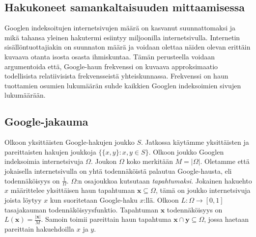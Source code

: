 \documentclass[12pt,finnish]{tktltiki2}
\theoremstyle{definition}
\theoremstyle{remark}
\begin{document}

    \subsection{Hakukoneet samankaltaisuuden mittaamisessa} %
    \label{sub:hakukoneet_samankaltaisuuden_mittaamisessa}

    Googlen indeksoitujen internetsivujen määrä on kasvanut suunnattomaksi ja mikä tahansa yleinen hakutermi esiintyy miljoonilla internetsivulla. Internetin sisällöntuottajiakin on suunnaton määrä ja voidaan olettaa näiden olevan erittäin kuvaava otanta isosta osasta ihmiskuntaa.
    Tämän perusteella voidaan argumentoida että, Google-haun frekvenssi on kuvaava approksimaatio todellisista relatiivisista frekvensseistä yhteiskunnassa.
    Frekvenssi on haun tuottamien osumien lukumäärän suhde kaikkien Googlen indeksoimien sivujen lukumäärään. \cite{cilibrasi2007google}

    \subsection{Google-jakauma} %
    \label{sub:google_jakauma}
      Olkoon yksittäisten Google-hakujen joukko $S$.
      Jatkossa käytämme yksittäisten ja pareittaisten hakujen joukkoja $\{\{x,y\}:x,y \in S\}$.
      Olkoon joukko Googlen indeksoimia internetsivuja $\Omega$.
      Joukon $\Omega$ koko merkitään $M = |\Omega|$.
      Oletamme että jokaisella internetsivulla on yhtä todennäköistä palautua Google-hausta, eli todennäköisyys on $\frac{1}{\Omega}$.
      $\Omega$:n osajoukkoa kutsutaan \emph{tapahtumaksi}.
      Jokainen hakuehto $x$ määrittelee yksittäisen haun tapahtuman $\mathbf{x}\subseteq \Omega$, tämä on joukko internetsivuja joista löytyy $x$ kun suoritetaan Google-haku $x$:llä.
      Olkoon $L: \Omega \rightarrow [0,1]$ tasajakauman todennäköisyysfunktio.
      Tapahtuman $\mathbf{x}$ todennäköisyys on $L(\mathbf{x}) = \frac{|\mathbf{x}|}{M}$.
      Samoin toimii pareittain haun tapahtuma $\mathbf{x}\cap\mathbf{y}\subseteq\Omega$, jossa haetaan pareittain hakuehdoilla $x$ ja $y$.
\end{document}
